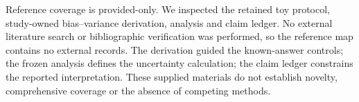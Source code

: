 Reference coverage is provided-only. We inspected the retained toy protocol,
study-owned bias--variance derivation, analysis and claim ledger. No external
literature search or bibliographic verification was performed, so the reference
map contains no external records. The derivation guided the known-answer
controls; the frozen analysis defines the uncertainty calculation; the claim
ledger constrains the reported interpretation. These supplied materials do not
establish novelty, comprehensive coverage or the absence of competing methods.
